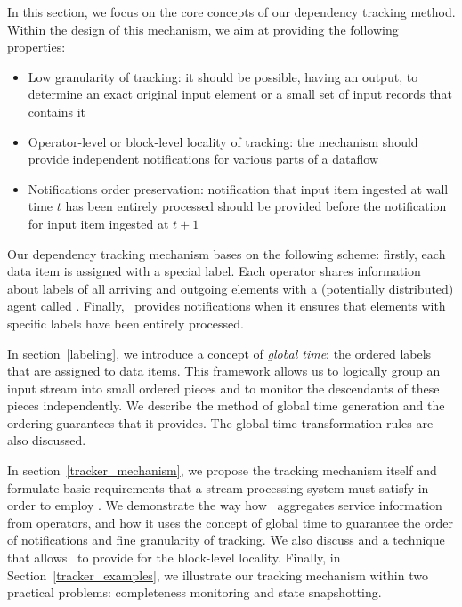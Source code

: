\label{fs-acker-design}

In this section, we focus on the core concepts of our dependency tracking method. Within the design of this mechanism, we aim at providing the following properties:
\begin{itemize}
    \item Low granularity of tracking: it should be possible, having an output, to determine an exact original input element or a small set of input records that contains it
    \item Operator-level or block-level locality of tracking: the mechanism should provide independent notifications for various parts of a dataflow
    \item Notifications order preservation: notification that input item ingested at wall time $t$ has been entirely processed should be provided before the notification for input item ingested at $t+1$
\end{itemize}

Our dependency tracking mechanism bases on the following scheme: firstly, each data item is assigned with a special label. Each operator shares information about labels of all arriving and outgoing elements with a (potentially distributed) agent called {\em \tracker}. Finally, \tracker\ provides notifications when it ensures that elements with specific labels have been entirely processed.

In section~\ref{labeling}, we introduce a concept of {\em global time}: the ordered labels that are assigned to data items. This framework allows us to logically group an input stream into small ordered pieces and to monitor the descendants of these pieces independently. We describe the method of global time generation and the ordering guarantees that it provides. The global time transformation rules are also discussed.

In section~\ref{tracker_mechanism}, we propose the tracking mechanism itself and formulate basic requirements that a stream processing system must satisfy in order to employ \tracker . We demonstrate the way how \tracker\ aggregates service information from operators, and how it uses the concept of global time to guarantee the order of notifications and fine granularity of tracking. We also discuss and a technique that allows \tracker\ to provide for the block-level locality. Finally, in Section~\ref{tracker_examples}, we illustrate our tracking mechanism within two practical problems: completeness monitoring and state snapshotting.


